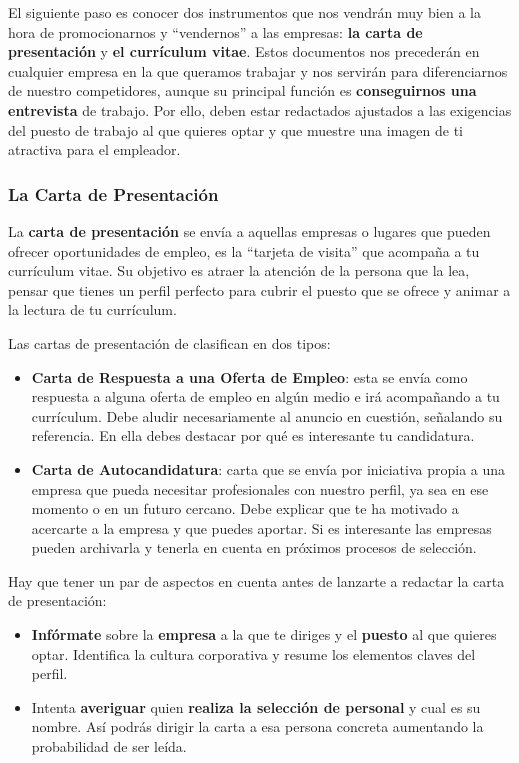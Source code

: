 El siguiente paso es conocer dos instrumentos que nos vendrán muy bien a la hora de promocionarnos y ``vendernos'' a las empresas: \textbf{la carta de presentación} y \textbf{el currículum vitae}. Estos documentos nos precederán en cualquier empresa en la que queramos trabajar y nos servirán para diferenciarnos de nuestro competidores, aunque su principal función es \textbf{conseguirnos una entrevista} de trabajo. Por ello, deben estar redactados ajustados a las exigencias del puesto de trabajo al que quieres optar y que muestre una imagen de ti atractiva para el empleador.

\subsubsection*{La Carta de Presentación}
La \textbf{carta de presentación} se envía a aquellas empresas o lugares que pueden ofrecer oportunidades de empleo, es la ``tarjeta de visita'' que acompaña a tu currículum vitae. Su objetivo es atraer la atención de la persona que la lea, pensar que tienes un perfil perfecto para cubrir el puesto que se ofrece y animar a la lectura de tu currículum.

Las cartas de presentación de clasifican en dos tipos:

\begin{itemize}
    \item \textbf{Carta de Respuesta a una Oferta de Empleo}: esta se envía como respuesta a alguna oferta de empleo en algún medio e irá acompañando a tu currículum. Debe aludir necesariamente al anuncio en cuestión, señalando su referencia. En ella debes destacar por qué es interesante tu candidatura.
    \item \textbf{Carta de Autocandidatura}: carta que se envía por iniciativa propia a una empresa que pueda necesitar profesionales con nuestro perfil, ya sea en ese momento o en un futuro cercano. Debe explicar que te ha motivado a acercarte a la empresa y que puedes aportar. Si es interesante las empresas pueden archivarla y tenerla en cuenta en próximos procesos de selección.
\end{itemize}

Hay que tener un par de aspectos en cuenta antes de lanzarte a redactar la carta de presentación:

\begin{itemize}
    \item \textbf{Infórmate} sobre la \textbf{empresa} a la que te diriges y el \textbf{puesto} al que quieres optar. Identifica la cultura corporativa y resume los elementos claves del perfil.
    \item Intenta \textbf{averiguar} quien \textbf{realiza la selección de personal} y cual es su nombre. Así podrás dirigir la carta a esa persona concreta aumentando la probabilidad de ser leída.
\end{itemize}

